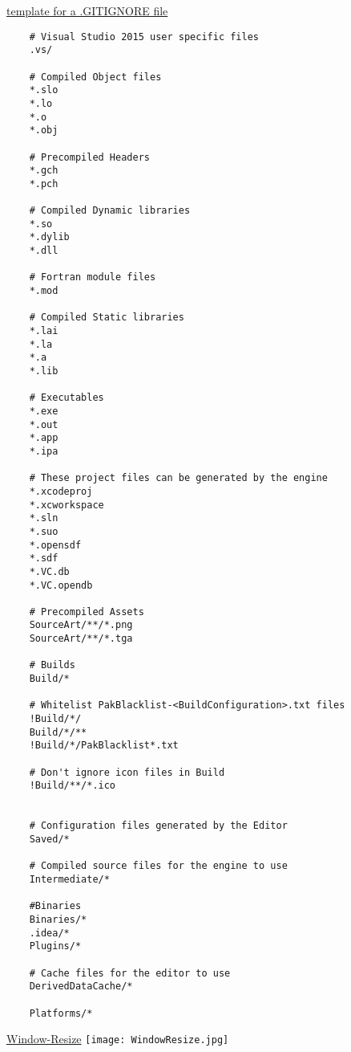 \documentclass{scrbook}
\begin{document}
        \uline{template for a .GITIGNORE file}
        \begin{lstlisting}
    # Visual Studio 2015 user specific files
    .vs/
    
    # Compiled Object files
    *.slo
    *.lo
    *.o
    *.obj
    
    # Precompiled Headers
    *.gch
    *.pch
    
    # Compiled Dynamic libraries
    *.so
    *.dylib
    *.dll
    
    # Fortran module files
    *.mod
    
    # Compiled Static libraries
    *.lai
    *.la
    *.a
    *.lib
    
    # Executables
    *.exe
    *.out
    *.app
    *.ipa
    
    # These project files can be generated by the engine
    *.xcodeproj
    *.xcworkspace
    *.sln
    *.suo
    *.opensdf
    *.sdf
    *.VC.db
    *.VC.opendb
    
    # Precompiled Assets
    SourceArt/**/*.png
    SourceArt/**/*.tga
    
    # Builds
    Build/*
    
    # Whitelist PakBlacklist-<BuildConfiguration>.txt files
    !Build/*/
    Build/*/**
    !Build/*/PakBlacklist*.txt
    
    # Don't ignore icon files in Build
    !Build/**/*.ico
    
    
    # Configuration files generated by the Editor
    Saved/*
    
    # Compiled source files for the engine to use
    Intermediate/*
    
    #Binaries
    Binaries/*
    .idea/*
    Plugins/*
    
    # Cache files for the editor to use
    DerivedDataCache/*
    
    Platforms/*
        \end{lstlisting}

        \uline{Window-Resize}
        \texttt{[image: WindowResize.jpg]}
\end{document}
